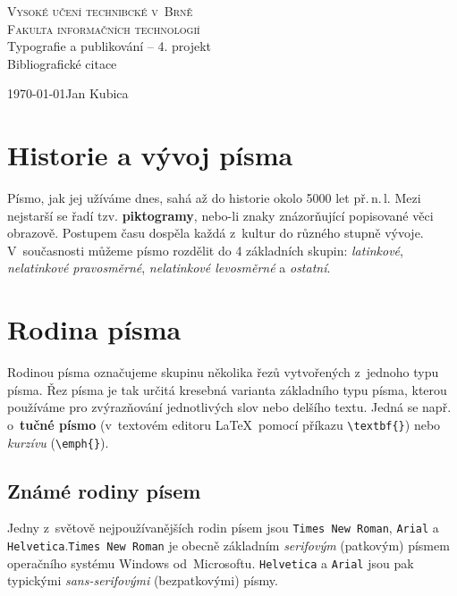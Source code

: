 \documentclass[11pt, a4paper]{article}
\author{Jan Kubica}
\begin{document}
	\begin{titlepage}
		\begin{center}
			\textsc{\Huge Vysoké učení technibcké v~Brně} \\[8pt]
			\textsc{\huge Fakulta informačních technologií} \\[16pt]
			{\LARGE Typografie a publikování -- 4. projekt} \\[6pt]
			{\Huge Bibliografické citace}
		\end{center}
		{\Large \today \hfill Jan Kubica}
	\end{titlepage}


\section{Historie a vývoj písma}

Písmo, jak jej užíváme dnes, sahá až do historie okolo 5000 let př.\,n.\,l. Mezi nejstarší se řadí tzv. \textbf{piktogramy}, nebo-li znaky znázorňující popisované věci obrazově. Postupem času dospěla každá z~kultur do různého stupně vývoje. V~současnosti můžeme písmo rozdělit do 4 základních skupin: \emph{latinkové}, \emph{nelatinkové pravosměrné}, \emph{nelatinkové
levosměrné} a \emph{ostatní}.
\cite{wiki:pismo}\cite{znak_sady}

\section{Rodina písma}
Rodinou písma označujeme skupinu několika řezů vytvořených z~jednoho typu písma. Řez písma je tak určitá kresebná varianta základního typu písma, kterou používáme pro zvýrazňování jednotlivých slov nebo delšího textu. Jedná se např. o~\textbf{tučné písmo} (v~textovém editoru \LaTeX\ pomocí příkazu \verb|\textbf{}|) nebo \linebreak \emph{kurzívu} (\verb|\emph{}|).\cite{manual}\cite{tex_companion}

\subsection{Známé rodiny písem}
Jedny z~světově nejpoužívanějších rodin písem jsou \texttt{Times New Roman}, \texttt{Arial} a \texttt{Helvetica}.\linebreak \texttt{Times New Roman} je obecně základním \emph{serifovým} (patkovým) písmem operačního systému Windows \linebreak od~Microsoftu. \texttt{Helvetica} a \texttt{Arial} jsou pak typickými \emph{sans-serifovými} (bezpatkovými) písmy.\cite{typomil}
\end{document}
